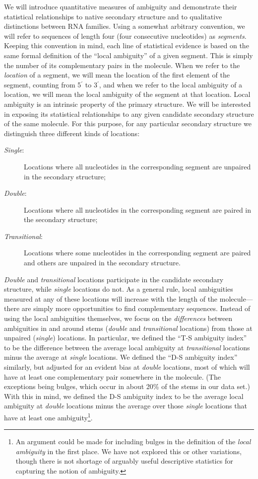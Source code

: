 \documentclass[10pt,letterpaper]{article}
\begin{document}
We will introduce quantitative measures of ambiguity and demonstrate their statistical relationships to native secondary structure and to qualitative distinctions between RNA families.
Using a somewhat arbitrary convention, we will
refer to sequences of length four (four consecutive nucleotides) as {\em segments}. Keeping this convention in mind, each line of statistical
evidence is based on the same formal definition of the ``local ambiguity'' of a given segment. This is simply the number of its complementary pairs in the molecule. 
When we refer to the {\em location} of a segment, we will mean the location of the first element of the segment, counting from 5$^\prime$ to 3$^\prime$, and  
when we refer to the local ambiguity of a location, we will mean the local ambiguity of the segment at that location. 
Local ambiguity is an intrinsic property of the primary structure. We will be interested in exposing its statistical relationships to any given candidate secondary structure of the same molecule. For this purpose, for any particular secondary structure we distinguish three different kinds of locations:
\begin{description}
	\item[\textit{Single}:] Locations where all nucleotides in the corresponding segment are unpaired in the secondary structure;
	\item[\textit{Double}:] Locations where all nucleotides in the corresponding segment are paired in the secondary structure;
	\item[\textit{Transitional}:] Locations where some nucleotides in the corresponding segment are paired and others are unpaired in the secondary structure.
\end{description}
{\em Double} and {\em transitional} locations participate in the candidate secondary structure, while {\em single} locations do not.
As a general rule, local ambiguities measured at any of these locations will increase with the length of the molecule---there are simply more opportunities to find complementary sequences.
Instead of using the local ambiguities themselves, we focus on the {\em differences} between ambiguities in and around stems ({\em double} and {\em transitional} locations) from those at unpaired ({\em single}) locations. In particular, we defined the ``T-S ambiguity index'' to be the difference between the average local ambiguity at {\em transitional} locations minus the average at {\em single} locations. We defined the ``D-S ambiguity index'' similarly, but adjusted for an evident bias at {\em double} locations, most of which will have at least one complementary pair somewhere in the molecule. 
(The exceptions being bulges, which occur in about 20\% of the stems in our data set.)
With this in mind, we defined the D-S ambiguity index to be the average local ambiguity at {\em double} locations minus the average over those {\em single} locations that have at least one ambiguity\footnote{
An argument could be made for including bulges in the definition of the {\em local ambiguity} in the first place. We have not explored this or other variations, though there is not shortage of arguably useful descriptive statistics for capturing the notion of ambiguity.}.
\end{document}
